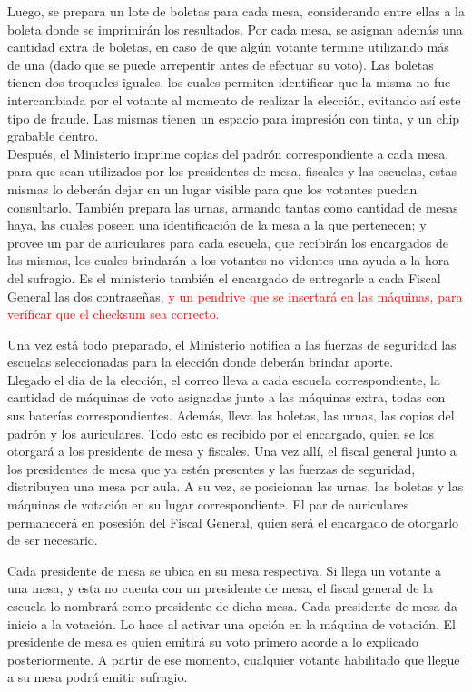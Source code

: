 Luego, se prepara un lote de boletas para cada mesa, considerando entre ellas a la boleta donde se imprimirán los resultados. Por cada mesa, se asignan además una cantidad extra de boletas, en caso de que algún votante termine utilizando más de una (dado que se puede arrepentir antes de efectuar su voto). Las boletas tienen dos troqueles iguales, los cuales permiten identificar que la misma no fue intercambiada por el votante al momento de realizar la elección, evitando así este tipo de fraude. Las mismas tienen un espacio para impresión con tinta, y un chip grabable dentro.\\

Después, el Ministerio imprime copias del padrón correspondiente a cada mesa, para que sean utilizados por los presidentes de mesa, fiscales y las escuelas, estas mismas lo deberán dejar en un lugar visible para que los votantes puedan consultarlo. También prepara las urnas, armando tantas como cantidad de mesas haya, las cuales poseen una identificación de la mesa a la que pertenecen; y provee un par de auriculares para cada escuela, que recibirán los encargados de las mismas, los cuales brindarán a los votantes no videntes una ayuda a la hora del sufragio. Es el ministerio también el encargado de entregarle a cada Fiscal General las dos contraseñas, \textcolor{red}{y un pendrive que se insertará en las máquinas, para veríficar que el checksum sea correcto.}

Una vez está todo preparado, el Ministerio notifica a las fuerzas de seguridad las escuelas seleccionadas para la elección donde deberán brindar aporte.\\

Llegado el dia de la elección, el correo lleva a cada escuela correspondiente, la cantidad de máquinas de voto asignadas junto a las máquinas extra, todas con sus baterías correspondientes. Además, lleva las boletas, las urnas, las copias del padrón y los auriculares. Todo esto es recibido por el encargado, quien se los otorgará a los presidente de mesa y fiscales. Una vez allí, el fiscal general junto a los presidentes de mesa que ya estén presentes y las fuerzas de seguridad, distribuyen una mesa por aula. A su vez, se posicionan las urnas, las boletas y las máquinas de votación en su lugar correspondiente. El par de auriculares permanecerá en posesión del Fiscal General, quien será el encargado de otorgarlo de ser necesario.

Cada presidente de mesa se ubica en su mesa respectiva. Si llega un votante a una mesa, y esta no cuenta con un presidente de mesa, el fiscal general de la escuela lo nombrará como presidente de dicha mesa. Cada presidente de mesa da inicio a la votación. Lo hace al activar una opción en la máquina de votación. El presidente de mesa es quien emitirá su voto primero acorde a lo explicado posteriormente. A partir de ese momento, cualquier votante habilitado que llegue a su mesa podrá emitir sufragio.

